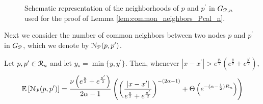 \begin{appendices}
\begin{figure}
\caption{Schematic representation of the neighborhoods of $p$ and $p^\prime$ in $G_{{\mathcal P},n}$ used for the proof of Lemma \ref{lem:common_neighbors_Pcal_n}.}
\label{fig:representation_joint_neighborhoods}
\end{figure}

Next we consider the number of common neighbors between two nodes $p$ and $p^\prime$ in $G_{{\mathcal P}}$, which we denote by ${\mathcal N}_{{\mathcal P}}(p,p^\prime)$. 

\begin{lemma}\label{lem:common_neighbors_Pcal_n}
Let $p, p^\prime \in {\mathcal R}_n$ and let $y_\ast = \min\{y, y^\prime\}$. Then, whenever $|x - x^\prime| > e^{\frac{y_\ast}{2}}\left(e^{\frac{y}{2}} + e^{\frac{y^\prime}{2}}\right)$,
\[
	\mathbb{E}\left[{\mathcal N}_{{\mathcal P}}(p,p^\prime)\right] = \frac{\nu\left(e^{\frac{y}{2}} + e^{\frac{y^\prime}{2}}\right)}{2\alpha - 1}\left(
    	\left(\frac{|x - x^\prime|}{e^{\frac{y}{2}} + e^{\frac{y^\prime}{2}}}\right)^{-(2\alpha - 1)}
        + \Theta\left(e^{-(\alpha - \frac{1}{2})R_n}\right)\right)
\]
\end{lemma}


\end{appendices}
